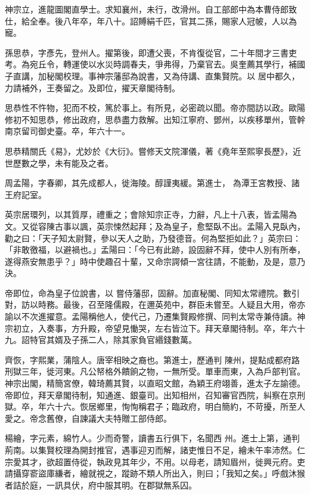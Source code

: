 \begin{pinyinscope}
 神宗立，進龍圖閣直學士。求知襄州，未行，改滑州。自工部郎中為本曹侍郎致仕，給全奉。後八年卒，年八十。詔賻絹千匹，官其二孫，賜家人冠帔，人以為寵。



 孫思恭，字彥先，登州人。擢第後，即遭父喪，不肯復從官，二十年間才三書吏考。為宛丘令，轉運使以水災時調春夫，爭弗得，乃棄官去。吳奎薦其學行，補國子直講，加秘閣校理。事神宗藩邸為說書，又為侍講、直集賢院。以
 居中都久，力請補外，王奏留之。及即位，擢天章閣待制。



 思恭性不忤物，犯而不校，篤於事上。有所見，必密疏以聞。帝亦間訪以政。歐陽修初不知思恭，修出政府，思恭盡力救解。出知江寧府、鄧州，以疾移單州，管幹南京留司御史臺。卒，年六十一。



 思恭精關氏《易》，尤妙於《大衍》。嘗修天文院渾儀，著《堯年至熙寧長歷》，近世歷數之學，未有能及之者。



 周孟陽，字春卿，其先成都人，徙海陵。醇謹夷緩。第進士，
 為潭王宮教授、諸王府記室。



 英宗居環列，以其質厚，禮重之；會除知宗正寺，力辭，凡上十八表，皆孟陽為文。又從容陳古事以諷，英宗悚然起拜；及為皇子，愈堅臥不出。孟陽入見臥內，勸之曰：「天子知太尉賢，參以天人之助，乃發德音。何為堅拒如此？」英宗曰：「非敢徼福，以避禍也。」孟陽曰：「今已有此跡，設固辭不拜，使中人別有所奉，遂得燕安無患乎？」時中使趣召十輩，又命宗諤傾一宮往請，不能動，及是，意乃決。



 帝即位，命為皇子位說書，以
 嘗侍藩邸，固辭。加直秘閣、同知太常禮院。數引對，訪以時務。最後，召至隆儒殿，在邇英苑中，群臣未嘗至。人疑且大用，帝亦諭以不次進擢意。孟陽稱他人，使代己，乃遷集賢殿修撰、同判太常寺兼侍讀。神宗初立，入奏事，方升殿，帝望見慟哭，左右皆泣下。拜天章閣待制。卒，年六十九。詔特官其婿及子孫二人，除其家負官緡錢數萬。



 齊恢，字熙業，蒲陰人。唐宰相映之裔也。第進士，歷通判
 陳州，提點成都府路刑獄三年，徙河東。凡公帑格外饋餉之物，一無所受。單車而東，入為戶部判官。神宗出閣，精簡宮僚，韓琦薦其賢，以直昭文館，為穎王府翊善，進太子左諭德。帝即位，拜天章閣待制，知通進、銀臺司。出知相州，召知審官西院，糾察在京刑獄。卒，年六十六。恢居鄉里，恂恂稱君子；臨政府，明白簡約，不苛擾，所至人愛之。帝念舊僚，自諫議大夫特贈工部侍郎。



 楊繪，字元素，綿竹人。少而奇警，讀書五行俱下，名聞西
 州。進士上第，通判荊南。以集賢校理為開封推官，遇事迎刃而解，諸吏惟日不足，繪未午率沛然。仁宗愛其才，欲超置侍從，執政見其年少，不用。以母老，請知眉州，徙興元府。吏請攝穿窬盜庫縑者，繪就視之，蹤跡不類人所出入，則曰；「我知之矣。」呼戲沐猴者詰於庭，一訊具伏，府中服其明。在郡獄無系囚。




\end{pinyinscope}
